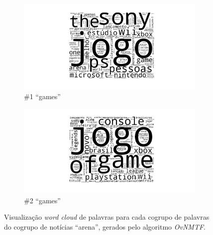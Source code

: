 \documentclass[
    12pt,                %
    oneside,            %
    a4paper,            %
    english,            %
    brazil                %
    ]{abntex2ppgsi}
\begin{document}
\begin{figure}[H]
\centering
    \begin{subfigure}[b]{0.45\textwidth}
        \includegraphics[width=\textwidth]{img/ovnmtf-nc-1-tc-1.png}
        \caption{\#1 ``games''}
    \end{subfigure}
    \begin{subfigure}[b]{0.45\textwidth}
        \includegraphics[width=\textwidth]{img/ovnmtf-nc-1-tc-2.png}
        \caption{\#2 ``games''}
    \end{subfigure}

    \caption{Visualização \textit{word cloud} de palavras para cada cogrupo de palavras do cogrupo de notícias ``arena'', gerados pelo algoritmo \textit{OvNMTF}.}
    \label{fig:ovnmtf:wordcloud-1}
\end{figure}
\end{document}
